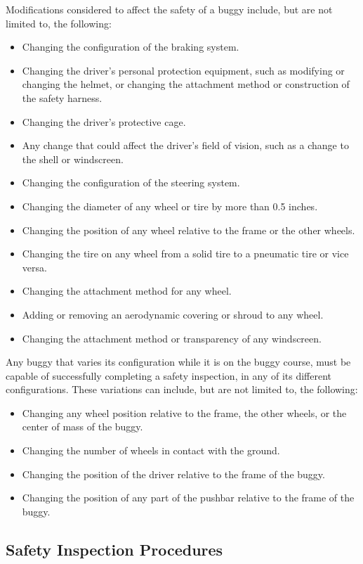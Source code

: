 \documentclass[openany]{book}
\begin{document}
Modifications considered to affect the safety of a buggy include, but are not limited to, the following:
\begin{itemize}
	\item Changing the configuration of the braking system.
	\item Changing the driver's personal protection equipment, such as modifying or changing the helmet, or changing the attachment method or construction of the safety harness.
	\item Changing the driver's protective cage.
	\item Any change that could affect the driver's field of vision, such as a change to the shell or windscreen.
	\item Changing the configuration of the steering system.
	\item Changing the diameter of any wheel or tire by more than 0.5 inches.
	\item Changing the position of any wheel relative to the frame or the other wheels.
	\item Changing the tire on any wheel from a solid tire to a pneumatic tire or vice versa.
	\item Changing the attachment method for any wheel.
	\item Adding or removing an aerodynamic covering or shroud to any wheel.
	\item Changing the attachment method or transparency of any windscreen.
\end{itemize}

Any buggy that varies its configuration while it is on the buggy course, must be capable of successfully completing a safety inspection, in any of its different configurations. These variations can include, but are not limited to, the following:
\begin{itemize}
	\item Changing any wheel position relative to the frame, the other wheels, or the center of mass of the buggy.
	\item Changing the number of wheels in contact with the ground.
	\item Changing the position of the driver relative to the frame of the buggy.
	\item Changing the position of any part of the pushbar relative to the frame of the buggy.
\end{itemize}

\subsection{Safety Inspection Procedures}
\end{document}
